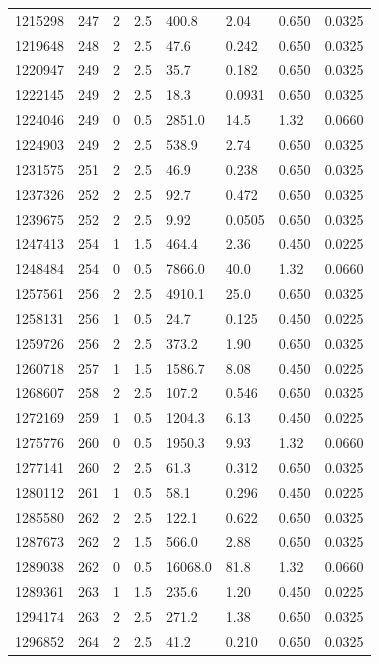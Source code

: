 \documentclass[preview]{standalone}
\begin{document}
{{{{{{{{\begin{tabular}{L{1.2cm}C{1.2cm} C{0.3cm}C{0.5cm} C{1.4cm}C{1.4cm} C{1.4cm}C{1.4cm}}
  1215298  &   247  & 2     & 2.5 &  400.8  & 2.04  & 0.650 &  0.0325   \\ 
  1219648  &   248  & 2     & 2.5 &  47.6  & 0.242  & 0.650 &  0.0325   \\ 
  1220947  &   249  & 2     & 2.5 &  35.7  & 0.182  & 0.650 &  0.0325   \\ 
  1222145  &   249  & 2     & 2.5 &  18.3  & 0.0931  & 0.650 &  0.0325   \\ 
  1224046  &   249  & 0     & 0.5 &  2851.0  & 14.5  & 1.32 &  0.0660   \\ 
  1224903  &   249  & 2     & 2.5 &  538.9  & 2.74  & 0.650 &  0.0325   \\ 
  1231575  &   251  & 2     & 2.5 &  46.9  & 0.238  & 0.650 &  0.0325   \\ 
  1237326  &   252  & 2     & 2.5 &  92.7  & 0.472  & 0.650 &  0.0325   \\ 
  1239675  &   252  & 2     & 2.5 &  9.92  & 0.0505  & 0.650 &  0.0325   \\ 
  1247413  &   254  & 1     & 1.5 &  464.4  & 2.36  & 0.450 &  0.0225   \\ 
  1248484  &   254  & 0     & 0.5 &  7866.0  & 40.0  & 1.32 &  0.0660   \\ 
  1257561  &   256  & 2     & 2.5 &  4910.1  & 25.0  & 0.650 &  0.0325   \\ 
  1258131  &   256  & 1     & 0.5 &  24.7  & 0.125  & 0.450 &  0.0225   \\ 
  1259726  &   256  & 2     & 2.5 &  373.2  & 1.90  & 0.650 &  0.0325   \\ 
  1260718  &   257  & 1     & 1.5 &  1586.7  & 8.08  & 0.450 &  0.0225   \\ 
  1268607  &   258  & 2     & 2.5 &  107.2  & 0.546  & 0.650 &  0.0325   \\ 
  1272169  &   259  & 1     & 0.5 &  1204.3  & 6.13  & 0.450 &  0.0225   \\ 
  1275776  &   260  & 0     & 0.5 &  1950.3  & 9.93  & 1.32 &  0.0660   \\ 
  1277141  &   260  & 2     & 2.5 &  61.3  & 0.312  & 0.650 &  0.0325   \\ 
  1280112  &   261  & 1     & 0.5 &  58.1  & 0.296  & 0.450 &  0.0225   \\ 
  1285580  &   262  & 2     & 2.5 &  122.1  & 0.622  & 0.650 &  0.0325   \\ 
  1287673  &   262  & 2     & 1.5 &  566.0  & 2.88  & 0.650 &  0.0325   \\ 
  1289038  &   262  & 0     & 0.5 &  16068.0  & 81.8  & 1.32 &  0.0660   \\ 
  1289361  &   263  & 1     & 1.5 &  235.6  & 1.20  & 0.450 &  0.0225   \\ 
  1294174  &   263  & 2     & 2.5 &  271.2  & 1.38  & 0.650 &  0.0325   \\ 
  1296852  &   264  & 2     & 2.5 &  41.2  & 0.210  & 0.650 &  0.0325   \\ 
\hline 
\end{tabular} 

}}}}}}}}
\end{document}
